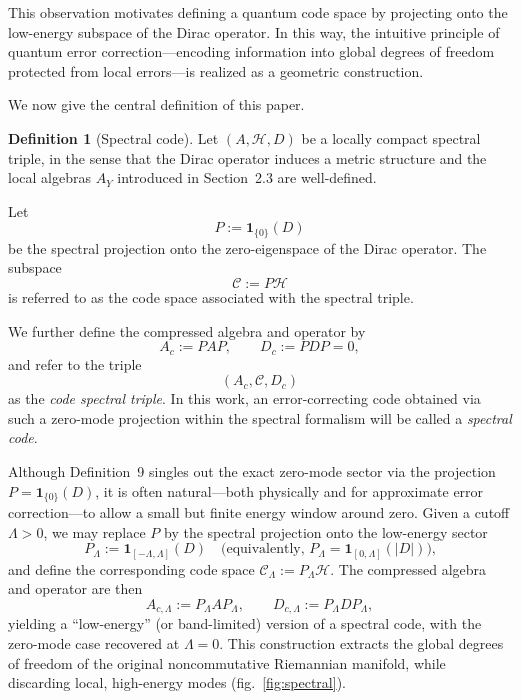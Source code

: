 \documentclass[12pt]{article}
\theoremstyle{definition} %
\newtheorem{definition}{Definition}
\theoremstyle{plain} %
\theoremstyle{remark} %
\theoremstyle{underline}
\begin{document}
This observation motivates defining a quantum code space by projecting onto the low-energy subspace of the Dirac operator. In this way, the intuitive principle of quantum error correction—encoding information into global degrees of freedom protected from local errors—is realized as a geometric construction.

We now give the central definition of this paper.

\begin{definition}[Spectral code]
    Let $(A,\mathcal{H},D)$ be a locally compact spectral triple, in the sense that the Dirac operator induces a metric structure and the local algebras $A_Y$ introduced in Section~2.3 are well-defined.
    
    Let
    \[
        P := \mathbf{1}_{\{0\}}(D)
    \]
    be the spectral projection onto the zero-eigenspace of the Dirac operator. The subspace
    \[
        \mathcal{C} := P\mathcal{H}
    \]
    is referred to as the code space associated with the spectral triple.
    
    We further define the compressed algebra and operator by
    \[
        A_c := P A P, \qquad D_c := P D P = 0,
    \]
    and refer to the triple
    \[
        (A_c,\mathcal{C},D_c)
    \]
    as the \emph{code spectral triple}.
    In this work, an error-correcting code obtained via such a zero-mode projection within the spectral formalism will be called a \emph{spectral code}.
\end{definition}

Although Definition~9 singles out the exact zero-mode sector via the projection $P=\mathbf{1}_{\{0\}}(D)$, it is often natural—both physically and for approximate error correction—to allow a small but finite energy window around zero.
Given a cutoff $\Lambda>0$, we may replace $P$ by the spectral projection onto the low-energy sector
\[
    P_{\Lambda}:=\mathbf{1}_{[-\Lambda,\Lambda]}(D)
    \quad\text{(equivalently, }P_{\Lambda}=\mathbf{1}_{[0,\Lambda]}(|D|)\text{),}
\]
and define the corresponding code space $\mathcal{C}_{\Lambda}:=P_{\Lambda}\mathcal{H}$.
The compressed algebra and operator are then
\[
    A_{c,\Lambda}:=P_{\Lambda}AP_{\Lambda}, \qquad D_{c,\Lambda}:=P_{\Lambda}DP_{\Lambda},
\]
yielding a ``low-energy'' (or band-limited) version of a spectral code, with the zero-mode case recovered at $\Lambda=0$.
This construction extracts the global degrees of freedom of the original noncommutative Riemannian manifold, while discarding local, high-energy modes
(fig.~\ref{fig:spectral}).
\end{document}
